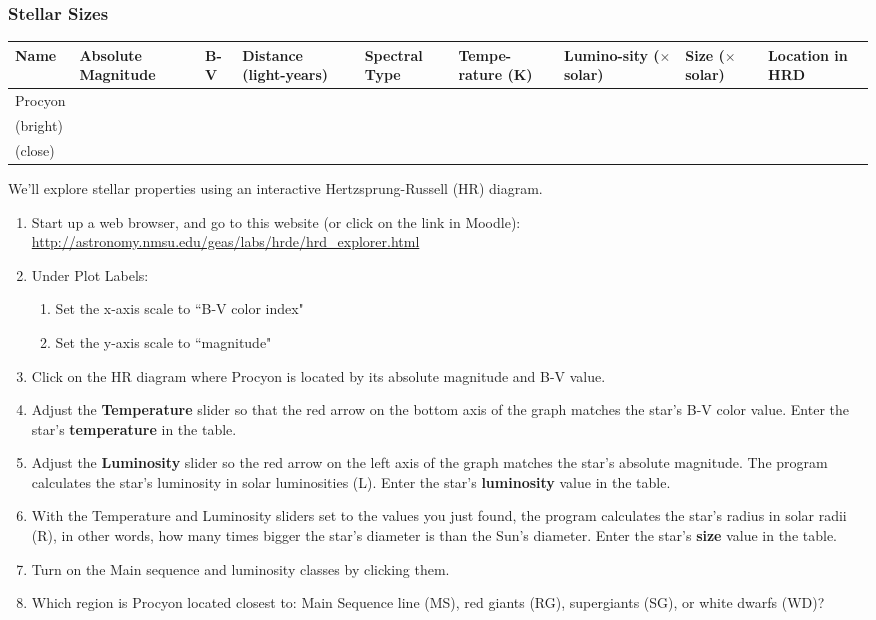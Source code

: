 \documentclass[main.tex]{subfiles}
\begin{document}
\subsubsection{Stellar Sizes}
\begin{table}[htbp]
\begin{center}
\begin{tabular}{|p{1.5cm}|p{1.5cm}|p{1cm}|p{1.5cm}|p{1.5cm}|p{1.5cm}|p{1.5cm}|p{1.5cm}|p{1.5cm}|}\hline
Name & Absolute Magnitude & B-V & Distance (light-years) & Spectral Type & Tempe-rature (K) & Lumino-sity ($\times$ solar) & Size ($\times$ solar) & Location in HRD \\\hline
Procyon

 &&&&&&&&\\\hline
(bright)


 &&&&&&&&\\\hline
(close)


 &&&&&&&&\\\hline
\end{tabular}
\end{center}
\label{tab:star}
\end{table}%
We'll explore stellar properties using an interactive Hertzsprung-Russell (HR) diagram.
\begin{enumerate}
\item Start up a web browser, and go to this website (or click on the link in Moodle): \url{http://astronomy.nmsu.edu/geas/labs/hrde/hrd_explorer.html}
\item Under Plot Labels:
	\begin{enumerate}
	\item Set the x-axis scale to ``B-V color index"
	\item Set the y-axis scale to ``magnitude"
	\end{enumerate}
\item Click on the HR diagram where Procyon is located by its absolute magnitude and B-V value.
\item Adjust the \textbf{Temperature} slider so that the red arrow on the bottom axis of the graph matches the star's B-V color value. Enter the star's \textbf{temperature} in the table.
\item Adjust the \textbf{Luminosity} slider so the red arrow on the left axis of the graph matches the star's absolute magnitude. The program calculates the star's luminosity in solar luminosities (L). Enter the star's \textbf{luminosity} value in the table. 
\item With the Temperature and Luminosity sliders set to the values you just found, the program calculates the star's radius in solar radii (R), in other words, how many times bigger the star's diameter is than the Sun's diameter. Enter the star's \textbf{size} value in the table.
\item Turn on the Main sequence and luminosity classes by clicking them.
\item Which region is Procyon located closest to: Main Sequence line (MS), red giants (RG), supergiants (SG), or white dwarfs (WD)?
\end{enumerate}
\end{document}
